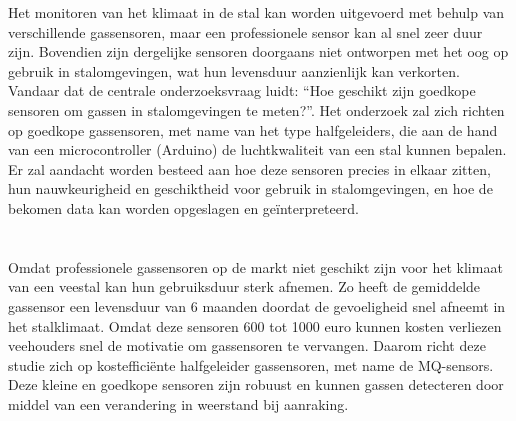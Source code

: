 Het monitoren van het klimaat in de stal kan worden uitgevoerd met behulp van verschillende gassensoren, maar een professionele sensor kan al snel zeer duur zijn. Bovendien zijn dergelijke sensoren doorgaans niet ontworpen met het oog op gebruik in stalomgevingen, wat hun levensduur aanzienlijk kan verkorten. Vandaar dat de centrale onderzoeksvraag luidt: ``Hoe geschikt zijn goedkope sensoren om gassen in stalomgevingen te meten?''. Het onderzoek zal zich richten op goedkope gassensoren, met name van het type halfgeleiders, die aan de hand van een microcontroller (Arduino) de luchtkwaliteit van een stal kunnen bepalen. Er zal aandacht worden besteed aan hoe deze sensoren precies in elkaar zitten, hun nauwkeurigheid en geschiktheid voor gebruik in stalomgevingen, en hoe de bekomen data kan worden opgeslagen en geïnterpreteerd.



\section{}%
\label{sec:probleemstelling}


Omdat professionele gassensoren op de markt niet geschikt zijn voor het klimaat van een veestal kan hun gebruiksduur sterk afnemen. Zo heeft de gemiddelde gassensor een levensduur van 6 maanden doordat de gevoeligheid snel afneemt in het stalklimaat. Omdat deze sensoren 600 tot 1000 euro kunnen kosten verliezen veehouders snel de motivatie om gassensoren te vervangen. Daarom richt deze studie zich op kostefficiënte halfgeleider gassensoren, met name de MQ-sensors. Deze kleine en goedkope sensoren zijn robuust en kunnen gassen detecteren door middel van een verandering in weerstand bij aanraking.

